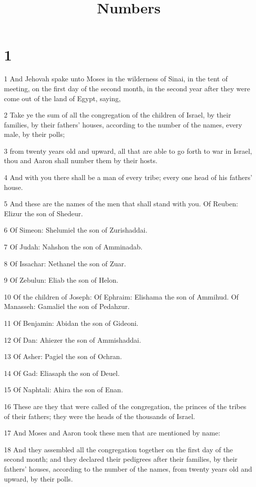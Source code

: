 

\title{Numbers}

\chapter{1}

\par 1 And Jehovah spake unto Moses in the wilderness of Sinai, in the tent of meeting, on the first day of the second month, in the second year after they were come out of the land of Egypt, saying,
\par 2 Take ye the sum of all the congregation of the children of Israel, by their families, by their fathers' houses, according to the number of the names, every male, by their polls;
\par 3 from twenty years old and upward, all that are able to go forth to war in Israel, thou and Aaron shall number them by their hosts.
\par 4 And with you there shall be a man of every tribe; every one head of his fathers' house.
\par 5 And these are the names of the men that shall stand with you. Of Reuben: Elizur the son of Shedeur.
\par 6 Of Simeon: Shelumiel the son of Zurishaddai.
\par 7 Of Judah: Nahshon the son of Amminadab.
\par 8 Of Issachar: Nethanel the son of Zuar.
\par 9 Of Zebulun: Eliab the son of Helon.
\par 10 Of the children of Joseph: Of Ephraim: Elishama the son of Ammihud. Of Manasseh: Gamaliel the son of Pedahzur.
\par 11 Of Benjamin: Abidan the son of Gideoni.
\par 12 Of Dan: Ahiezer the son of Ammishaddai.
\par 13 Of Asher: Pagiel the son of Ochran.
\par 14 Of Gad: Eliasaph the son of Deuel.
\par 15 Of Naphtali: Ahira the son of Enan.
\par 16 These are they that were called of the congregation, the princes of the tribes of their fathers; they were the heads of the thousands of Israel.
\par 17 And Moses and Aaron took these men that are mentioned by name:
\par 18 And they assembled all the congregation together on the first day of the second month; and they declared their pedigrees after their families, by their fathers' houses, according to the number of the names, from twenty years old and upward, by their polls.
